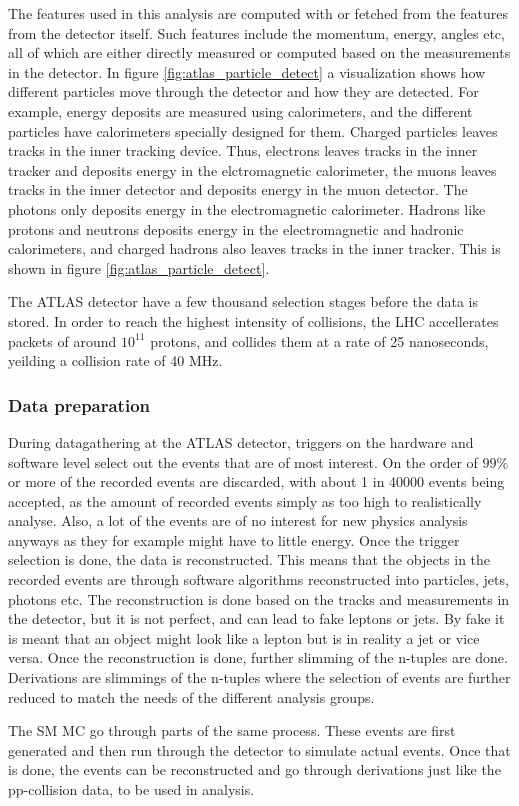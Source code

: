 The features used in this analysis are computed with or fetched from the features from the 
detector itself. Such features include the momentum, energy, angles etc, 
all of which are either directly measured or computed based on the measurements in the 
detector. In figure \ref{fig:atlas_particle_detect} a visualization shows how
different particles move through the detector and how they are detected. For example, 
energy deposits are measured using calorimeters, and the different particles 
have calorimeters specially designed for them. Charged particles leaves tracks in the 
inner tracking device. Thus, electrons leaves tracks in the inner tracker and deposits energy 
in the elctromagnetic calorimeter, the muons leaves tracks in the inner detector and 
deposits energy in the muon detector. The photons only deposits energy in the electromagnetic 
calorimeter. Hadrons like protons and neutrons deposits energy in the electromagnetic and 
hadronic calorimeters, and charged hadrons also leaves tracks in the inner tracker. This is 
shown in figure \ref{fig:atlas_particle_detect}.\par

The ATLAS detector have a few thousand selection stages before the data is stored. 
In order to reach the highest intensity of collisions, the LHC accellerates
packets of around $10^{11}$ protons, and collides them at a rate of 25 nanoseconds, 
yeilding a collision rate of 40 MHz\cite{Wang:2707056}. \cite{Bernius:2707054}



\subsubsection*{Data preparation}
During datagathering at the ATLAS detector, triggers on the hardware and software level select out the events that are of most interest. On the order of $99 \%$ or
 more of the recorded events are discarded, with about 1 in 40000 events being accepted, as the amount of recorded events simply as too high to realistically analyse. Also, a lot of the events are of no 
 interest for new physics analysis anyways as they for example might have to little energy. Once the trigger selection is done, the data is reconstructed. This means that the objects
 in the recorded events are through software algorithms reconstructed into particles, jets, photons etc. The reconstruction is done based on the tracks and measurements
 in the detector, but it is not perfect, and can lead to fake leptons or jets. By fake it is meant that an object might look like a lepton but is in reality a jet or vice versa\cite{Gillam:2015kta}.
 Once the reconstruction is done, further slimming of the n-tuples are done. Derivations are slimmings of the n-tuples where the selection of events are further reduced 
 to match the needs of the different analysis groups. \par 
The SM MC go through parts of the same process. These events are first generated and then run through the detector to simulate actual events. Once that is done, the events
 can be reconstructed and go through derivations just like the pp-collision data, to be used in analysis. 

